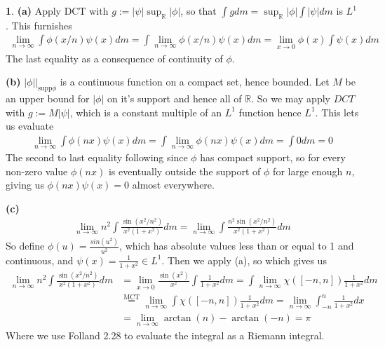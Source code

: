 \documentclass[10.5pt]{article}
\theoremstyle{definition}
\newtheorem{pb}{}
\newcommand{\abs}[1]{\lvert#1\rvert}
\begin{document}
\begin{pb}
    \textbf{(a)} Apply DCT with \(g := \abs{\psi}\sup_\mathbb{R}\abs{\phi}\), so that \(\int g dm = \sup_\mathbb{R}\abs{\phi} \int \abs{\psi} dm\) is \(L^1\).
    This furnishes
    \begin{align*}
        \lim_{n\to\infty}\int\phi(x/n)\psi(x)dm = \int \lim_{n\to\infty}\phi(x/n)\psi(x)dm = \lim_{x\to 0}\phi(x) \int\psi(x)dm
    \end{align*}
    The last equality as a consequence of continuity of \(\phi\).

    \textbf{(b)} \(\abs{\phi} \vert_{\text{supp}\phi}\) is a continuous function on a compact set, hence bounded. Let \(M\) be an upper bound for
    \(\abs{\phi}\) on it's support and hence all of \(\mathbb{R}\). So we may apply \(DCT\) with \(g := M\abs{\psi}\), which is a constant multiple of an \(L^1\)
    function hence \(L^1\). This lets us evaluate
    \begin{align*}
        \lim_{n\to\infty} \int \phi(nx)\psi(x)dm = \int \lim_{n\to\infty} \phi(nx)\psi(x)dm = \int 0 dm = 0
    \end{align*}
    The second to last equality following since \(\phi\) has compact support, so for every non-zero value \(\phi(nx)\) is eventually outside the support of \(\phi\) for
    large enough \(n\), giving us \(\phi(nx)\psi(x) = 0\) almost everywhere.

    \textbf{(c)}
    \begin{align*}
        \lim_{n\to\infty} n^2 \int \frac{\sin(x^2/n^2)}{x^2(1+x^2)}dm = \lim_{n\to\infty}\int\frac{n^2\sin(x^2/n^2)}{x^2(1+x^2)}dm
    \end{align*}
    So define \(\phi(u) = \frac{sin(u^2)}{u^2}\), which has absolute values less than or equal to 1 and continuous, and \(\psi(x) = \frac{1}{1 + x^2} \in L^1\).
    Then we apply (a), so which gives us
    \begin{align*}
        \lim_{n\to\infty} n^2 \int \frac{\sin(x^2/n^2)}{x^2(1+x^2)}dm &= \lim_{x\to 0}\frac{\sin(x^2)}{x^2} \int \frac{1}{1+x^2} dm 
        = \int \lim_{n \to \infty} \chi([-n,n])\frac{1}{1+x^2}dm \\
        &\overset{\text{MCT}}{=} \lim_{n \to \infty}\int \chi([-n,n])\frac{1}{1+x^2}dm = \lim_{n\to\infty}\int_{-n}^n \frac{1}{1+x^2} dx \\
        &= \lim_{n\to \infty} \arctan(n) - \arctan(-n) = \pi
    \end{align*}
    Where we use Folland 2.28 to evaluate the integral as a Riemann integral.


\end{pb}
\end{document}
